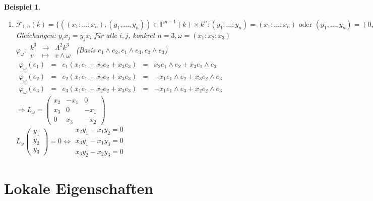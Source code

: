 \documentclass[a4paper,12pt]{report}
\theoremstyle{break}
\theoremstyle{nonumberbreak}
\newtheorem{nnBsp}{Beispiel}
\theoremstyle{nonumberplain}
\newcommand{\IP}{\mathbb{P}}%
\newcommand{\calF}{\mathcal{F}}
\begin{document}
\begin{nnBsp}\begin{enumerate}[\underline{$d=1$}:]\item
$\calF_{1,n}(k)=\{((x_1:\ldots :x_n),(y_1,\ldots ,y_n))\in\IP^{n-1}(k)\times k^n : (y_1:\ldots :y_n)=(x_1:\ldots :x_n) \text{ oder } (y_1,\ldots ,y_n)=(0,\ldots ,0)\}$\\
Gleichungen: $y_ix_j=y_jx_i$ f\"ur alle $i,j$, konkret $n=3, \omega=(x_1:x_2:x_3)$\\
$\varphi_\omega:\begin{array}{rcl} k^3&\to&\Lambda^2k^3\\v&\mapsto&v\wedge\omega\end{array}$ (Basis $e_1\wedge e_2, e_1\wedge e_3, e_2\wedge e_3$)\\
$\begin{array}{rclcr}
\varphi_\omega(e_1) &=& e_1 (x_1e_1+x_2e_2+x_3e_3) &=& x_2e_1\wedge e_2 + x_3e_1\wedge e_3\\
\varphi_\omega(e_2) &=& e_2 (x_1e_1+x_2e_2+x_3e_3) &=& -x_1e_1\wedge e_2 + x_3e_2\wedge e_3\\
\varphi_\omega(e_3) &=& e_3 (x_1e_1+x_2e_2+x_3e_3) &=&-x_1e_1\wedge e_3 + x_2e_2\wedge e_3\end{array}$\\
$\Rightarrow L_\omega = \begin{pmatrix}x_2&-x_1&0\\x_3&0&-x_1\\0&x_3&-x_2\end{pmatrix}$\\
$L_\omega\begin{pmatrix}y_1\\y_2\\y_3\end{pmatrix}=0 \Leftrightarrow \begin{matrix}x_2y_1-x_1y_2=0\\x_3y_1-x_1y_3=0\\x_3y_2-x_2y_3=0\end{matrix}$
\end{enumerate}\end{nnBsp}

\newpage


\chapter{Lokale Eigenschaften}
\setcounter{section}{14}
\end{document}
